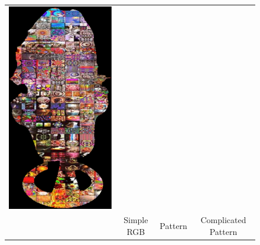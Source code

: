 \begin{figure}
{\begin{tabular}{cccc}
    \includegraphics[height=0.25\linewidth]{figures/result/comp_love_albedo.pdf} \\
     & {\small Simple RGB} & {\small Pattern} & {\small Complicated Pattern } \\
  


\end{tabular}}
\end{figure}
